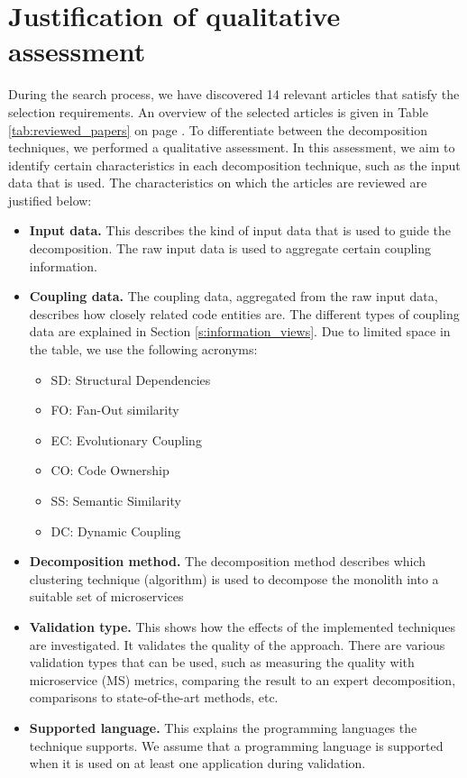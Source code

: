 \section{Justification of qualitative assessment}\label{s:justification_assessment}
During the search process, we have discovered 14 relevant articles that satisfy the selection requirements. An overview of the selected articles is given in Table \ref{tab:reviewed_papers} on page \pageref{tab:reviewed_papers}. To differentiate between the decomposition techniques, we performed a qualitative assessment. In this assessment, we aim to identify certain characteristics in each decomposition technique, such as the input data that is used. The characteristics on which the articles are reviewed are justified below:

\begin{itemize}
    \item \textbf{Input data.} This describes the kind of input data that is used to guide the decomposition. The raw input data is used to aggregate certain coupling information. 
    \item \textbf{Coupling data.} The coupling data, aggregated from the raw input data, describes how closely related code entities are. The different types of coupling data are explained in Section \ref{s:information_views}. Due to limited space in the table, we use the following acronyms:
    \begin{itemize}
        \item SD: Structural Dependencies
        \item FO: Fan-Out similarity
        \item EC: Evolutionary Coupling
        \item CO: Code Ownership
        \item SS: Semantic Similarity
        \item DC: Dynamic Coupling
    \end{itemize}
    \item \textbf{Decomposition method.} The decomposition method describes which clustering technique (algorithm) is used to decompose the monolith into a suitable set of microservices
    \item \textbf{Validation type.} This shows how the effects of the implemented techniques are investigated. It validates the quality of the approach. There are various validation types that can be used, such as measuring the quality with microservice (MS) metrics, comparing the result to an expert decomposition, comparisons to state-of-the-art methods, etc.
    \item \textbf{Supported language.} This explains the programming languages the technique supports. We assume that a programming language is supported when it is used on at least one application during validation.
\end{itemize}

